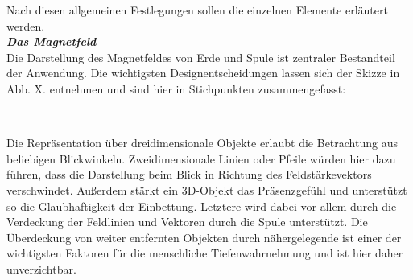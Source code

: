 Nach diesen allgemeinen Festlegungen sollen die einzelnen Elemente erläutert werden.\\

\textbf{\textit{Das Magnetfeld}}\\
Die Darstellung des Magnetfeldes von Erde und Spule ist zentraler Bestandteil der Anwendung. Die wichtigsten Designentscheidungen lassen sich der Skizze in Abb. X. entnehmen und sind hier in Stichpunkten zusammengefasst:

\begin{center}
	\\
\end{center}

Die Repräsentation über dreidimensionale Objekte erlaubt die Betrachtung aus beliebigen Blickwinkeln. Zweidimensionale Linien oder Pfeile würden hier dazu führen, dass die Darstellung beim Blick in Richtung des Feldstärkevektors verschwindet. Außerdem stärkt ein 3D-Objekt das Präsenzgefühl und unterstützt so die Glaubhaftigkeit der Einbettung. Letztere wird dabei vor allem durch die Verdeckung der Feldlinien und Vektoren durch die Spule unterstützt. Die Überdeckung von weiter entfernten Objekten durch nähergelegende ist einer der wichtigsten Faktoren für die menschliche Tiefenwahrnehmung und ist hier daher unverzichtbar.\\


